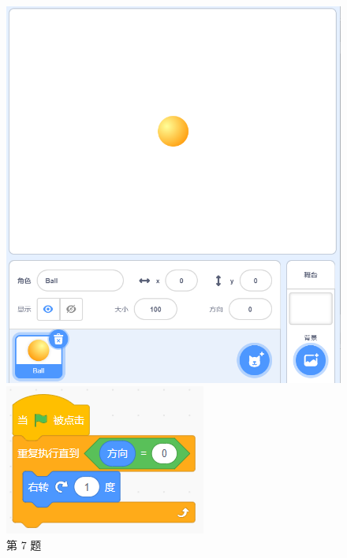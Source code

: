 \documentclass[10pt, a4paper]{article}
\begin{document}
\begin{enumerate}
        \begin{figure}[htbp]
            \centering
            \begin{minipage}[t]{.18\textwidth}
                \centering
                \includegraphics[width=\textwidth]{7.png}
                \caption*{第 7 题}
            \end{minipage}
            \begin{minipage}[t]{.4\textwidth}
                \centering
                \begin{minipage}[t]{.4\textwidth}
                    \centering
                    \includegraphics[width=\textwidth]{8-1.png}

\end{minipage}
\end{minipage}
\end{figure}
\end{enumerate}
\end{document}
